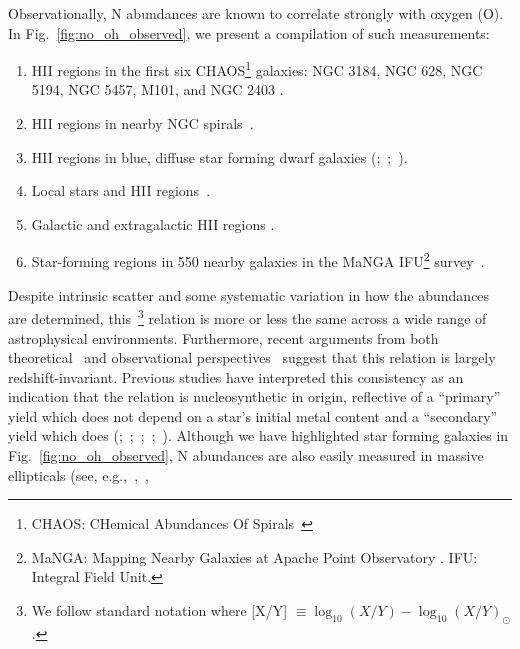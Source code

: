 \documentclass[ms.tex]{subfiles}
\begin{document}
Observationally, N abundances are known to correlate strongly with oxygen (O).
In Fig.~\ref{fig:no_oh_observed}, we present a compilation of such measurements:
\begin{enumerate}
	\item[\textbf{1.}] HII regions in the first six CHAOS\footnote{
		CHAOS: CHemical Abundances Of Spirals~\citep{Berg2015}
	} galaxies: NGC 3184, NGC 628, NGC 5194, NGC 5457, M101, and NGC 2403
	\citep{Berg2020, Skillman2020, Rogers2021}.

	\item[\textbf{2.}] HII regions in nearby NGC spirals~\citep*{Pilyugin2010}.

	\item[\textbf{3.}] HII regions in blue, diffuse star forming dwarf galaxies
	(\citealp{Berg2012};~\citealp*{Izotov2012};~\citealp{James2015}).

	\item[\textbf{4.}] Local stars and HII regions~\citep{Dopita2016}.

	\item[\textbf{5.}] Galactic and extragalactic HII regions
	\citep*{Henry2000}.

	\item[\textbf{6.}] Star-forming regions in 550  nearby galaxies in the
	MaNGA IFU\footnote{
		MaNGA: Mapping Nearby Galaxies at Apache Point Observatory
		\citep{Bundy2015}.
		IFU: Integral Field Unit.
	} survey~\citep{Belfiore2017}.
\end{enumerate}
Despite intrinsic scatter and some systematic variation in how the abundances
are determined, this~\ohno\footnote{
	We follow standard notation where [X/Y]
	$\equiv \log_{10}(X/Y) - \log_{10}(X/Y)_\odot$.
} relation is more or less the same across a wide range of astrophysical
environments.
Furthermore, recent arguments from both theoretical~\citep{Vincenzo2018} and
observational perspectives~\citep{HaydenPawson2021} suggest that this relation
is largely redshift-invariant.
Previous studies have interpreted this consistency as an indication that the
relation is nucleosynthetic in origin, reflective of a ``primary'' yield which
does not depend on a star's initial metal content and a ``secondary'' yield
which does (\citealp{VilaCostas1993};~\citealp*{vanZee1998};~\citealp{Henry1999,
PerezMontero2009};~\citealp*{Pilyugin2012};~\citealp{Andrews2013}).
Although we have highlighted star forming galaxies in
Fig.~\ref{fig:no_oh_observed}, N abundances are also easily measured in
massive ellipticals (see, e.g.,~\citealp{Schiavon2010},~\citealp{Conroy2013},
\end{document}
